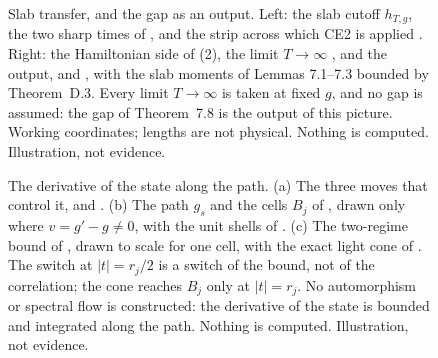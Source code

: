 \documentclass[11pt,a4paper]{article}
\begin{document}


\begin{figure}[htbp]
\centering

\caption{Slab transfer, and the gap as an output. Left: the slab cutoff $h_{T,g}$, the
two sharp times of , and the strip across which CE2 is
applied . Right: the Hamiltonian side of (2), the limit $T\to\infty$
, and the output,  and
, with the slab moments of Lemmas 7.1--7.3 bounded by Theorem~D.3.
Every limit $T\to\infty$ is taken at fixed $g$, and no gap is assumed: the gap of
Theorem~7.8 is the output of this picture. Working coordinates; lengths are not physical.
Nothing is computed. Illustration, not evidence.}
\label{fig:slab}
\end{figure}



\begin{figure}[t]
\centering

\caption{The derivative of the state along the path. (a) The three moves that control
it,  and . (b) The path
$g_s$ and the cells $B_j$ of , drawn only where $v=g'-g\ne0$, with
the unit shells of . (c) The two-regime bound of
, drawn to scale for one cell, with the exact light cone of
. The switch at $|t|=r_j/2$ is a switch of the bound, not of
the correlation; the cone reaches $B_j$ only at $|t|=r_j$. No automorphism or spectral
flow is constructed: the derivative of the state is bounded and integrated along the
path. Nothing is computed. Illustration, not evidence.}
\label{fig:lppl}
\end{figure}
\end{document}
